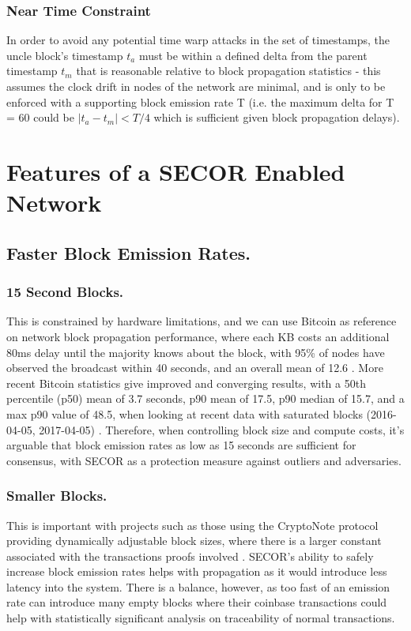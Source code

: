 \documentclass{article}
\begin{document}
\subsubsection{Near Time Constraint}
In order to avoid any potential time warp attacks in the set of timestamps, the uncle block's timestamp $t_a$ must be within a defined delta from the parent timestamp $t_m$ that is reasonable relative to block propagation statistics - this assumes the clock drift in nodes of the network are minimal, and is only to be enforced with a supporting block emission rate T (i.e. the maximum delta for T = 60 could be $\vert t_a - t_m \vert < T/4$ which is sufficient given block propagation delays).
\section{Features of a SECOR Enabled Network}
\subsection{Faster Block Emission Rates.}
\subsubsection{15 Second Blocks.}
This is constrained by hardware limitations, and we can use Bitcoin as reference on network block propagation performance, where each KB costs an additional 80ms delay until the majority knows about the block, with 95\% of nodes have observed the broadcast within 40 seconds, and an overall mean of 12.6 \cite{decker}. More recent Bitcoin statistics give improved and converging results, with a 50th percentile (p50) mean of 3.7 seconds, p90 mean of 17.5, p90 median of 15.7, and a max p90 value of 48.5, when looking at recent data with saturated blocks (2016-04-05, 2017-04-05) \cite{bitcoinstats}. Therefore, when controlling block size and compute costs, it's arguable that block emission rates as low as 15 seconds are sufficient for consensus, with SECOR as a protection measure against outliers and adversaries.
\subsubsection{Smaller Blocks.}
This is important with projects such as those using the CryptoNote protocol providing dynamically adjustable block sizes, where there is a larger constant associated with the transactions proofs involved \cite{saberhagen}. SECOR's ability to safely increase block emission rates helps with propagation as it would introduce less latency into the system. There is a balance, however, as too fast of an emission rate can introduce many empty blocks where their coinbase transactions could help with statistically significant analysis on traceability of normal transactions.
\end{document}
